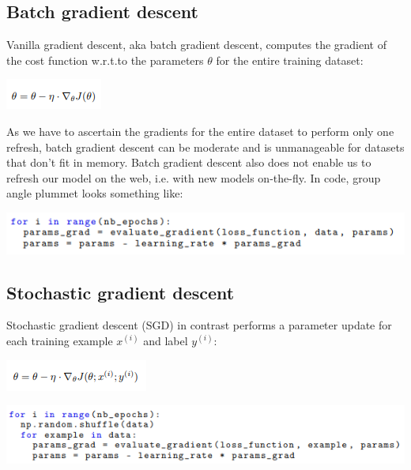 \documentclass[12pt]{article}
\begin{document}
\subsection*{Batch gradient descent}
\hspace*{10mm}Vanilla gradient descent, aka batch gradient descent, computes the gradient of the cost function w.r.t.to the parameters $\theta$ for the entire training dataset:
\begin{center}
\includegraphics[scale=1]{2}
\end{center}
\hspace*{10mm}As we have to ascertain the gradients for the entire dataset to perform only one refresh, batch gradient descent can be moderate and is unmanageable for datasets that don't fit in memory. Batch gradient descent also does not enable us to refresh our model on the web, i.e. with new models on-the-fly. In code, group angle plummet looks something like:
\begin{center}
\includegraphics[scale=1]{3}
\end{center}
\subsection*{Stochastic gradient descent}
Stochastic gradient descent (SGD) in contrast performs a parameter update for each training example $x^{(i)}$ and label $y^{(i)}$:
\begin{center}
\includegraphics[scale=1]{4}
\end{center}
\begin{center}
\includegraphics[scale=1]{5}
\end{center}
\end{document}
